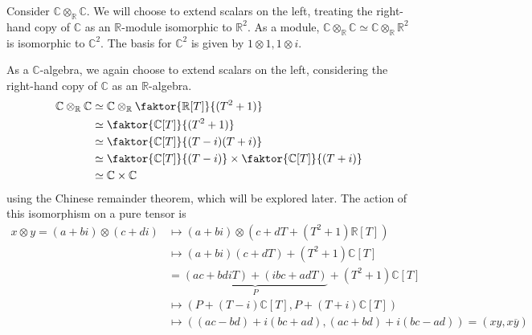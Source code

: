 \begin{example}
    Consider \( \mathbb C \otimes_{\mathbb R} \mathbb C \).
    We will choose to extend scalars on the left, treating the right-hand copy of \( \mathbb C \) as an \( \mathbb R \)-module isomorphic to \( \mathbb R^2 \).
    As a module, \( \mathbb C \otimes_{\mathbb R} \mathbb C \simeq \mathbb C \otimes_{\mathbb R} \mathbb R^2 \) is isomorphic to \( \mathbb C^2 \).
    The basis for \( \mathbb C^2 \) is given by \( 1 \otimes 1, 1 \otimes i \).

    As a \( \mathbb C \)-algebra, we again choose to extend scalars on the left, considering the right-hand copy of \( \mathbb C \) as an \( \mathbb R \)-algebra.
    \begin{align*}
        \mathbb C \otimes_{\mathbb R} \mathbb C &\simeq \mathbb C \otimes_{\mathbb R} \faktor{\mathbb R[T]}{(T^2 + 1)} \\
        &\simeq \faktor{\mathbb C[T]}{(T^2 + 1)} \\
        &\simeq \faktor{\mathbb C[T]}{(T-i)(T+i)} \\
        &\simeq \faktor{\mathbb C[T]}{(T-i)} \times \faktor{\mathbb C[T]}{(T+i)} \\
        &\simeq \mathbb C \times \mathbb C
    \end{align*}
    using the Chinese remainder theorem, which will be explored later.
    The action of this isomorphism on a pure tensor is
    \begin{align*}
        x \otimes y = (a + bi) \otimes (c + di) &\mapsto (a + bi) \otimes (c + dT + (T^2 + 1)\mathbb R[T]) \\
        &\mapsto (a + bi)(c + dT) + (T^2 + 1)\mathbb C[T] \\
        &= \underbrace{(ac + bdiT) + (ibc + adT)}_{P} + (T^2 + 1) \mathbb C[T] \\
        &\mapsto (P + (T - i) \mathbb C[T], P + (T + i) \mathbb C[T]) \\
        &\mapsto ((ac - bd) + i(bc + ad), (ac + bd) + i(bc - ad)) = (xy, x \overline{y})
    \end{align*}
\end{example}

